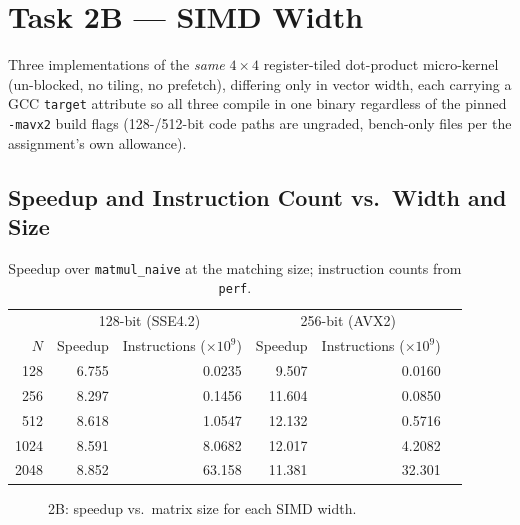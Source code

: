 \documentclass[11pt]{article}
\begin{document}
\section{Task 2B --- SIMD Width}

Three implementations of the \emph{same} $4\times4$ register-tiled dot-product
micro-kernel (un-blocked, no tiling, no prefetch), differing only in vector width, each
carrying a GCC \texttt{target} attribute so all three compile in one binary regardless of
the pinned \texttt{-mavx2} build flags (128-/512-bit code paths are ungraded, bench-only
files per the assignment's own allowance).

\subsection{Speedup and Instruction Count vs.\ Width and Size}

\begin{table}[h]
\centering
\begin{tabular}{r r r r r r}
\toprule
& \multicolumn{2}{c}{128-bit (SSE4.2)} & \multicolumn{2}{c}{256-bit (AVX2)} & \\
$N$ & {Speedup} & {Instructions ($\times10^9$)} & {Speedup} & {Instructions ($\times10^9$)} & \\
\midrule
128  & 6.755 & 0.0235 & 9.507  & 0.0160 & \\
256  & 8.297 & 0.1456 & 11.604 & 0.0850 & \\
512  & 8.618 & 1.0547 & 12.132 & 0.5716 & \\
1024 & 8.591 & 8.0682 & 12.017 & 4.2082 & \\
2048 & 8.852 & 63.158 & 11.381 & 32.301 & \\
\bottomrule
\end{tabular}
\caption{Speedup over \texttt{matmul\_naive} at the matching size; instruction counts from \texttt{perf}.}
\end{table}

\begin{figure}[h]
\centering
{}
\caption{2B: speedup vs.\ matrix size for each SIMD width.}
\end{figure}
\end{document}
